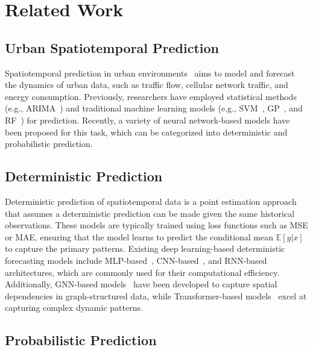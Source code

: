 \section{Related Work}
\subsection{Urban Spatiotemporal Prediction}

Spatiotemporal prediction in urban environments~\cite{zhang2017deep, yuan2024unist, yu2017spatio} aims to model and forecast the dynamics of urban data, such as traffic flow, cellular network traffic, and energy consumption. Previously, researchers have employed statistical methods (e.g., ARIMA~\cite{bouznad2020trend}) and traditional machine learning models (e.g., SVM~\cite{ohashi2012wind}, GP~\cite{senanayake2016predicting}, and RF~\cite{hengl2018random}) for prediction. Recently, a variety of neural network-based models have been proposed for this task, which can be categorized into deterministic and probabilistic prediction. 

\subsection{Deterministic  Prediction}

Deterministic prediction of spatiotemporal data is a point estimation approach that assumes a deterministic prediction can be made given the same historical observations. These models are typically trained using loss functions such as MSE or MAE, ensuring that the model learns to predict the conditional mean \(\mathbb{E}[y|x]\) to capture the primary patterns. Existing deep learning-based deterministic forecasting models include MLP-based~\cite{shao2022spatial,qin2023spatio,zhang2023mlpst}, CNN-based~\cite{li2017diffusion,liu2018attentive,zhang2017deep}, and RNN-based~\cite{bai2019passenger,lin2020self,wang2017predrnn,wang2018predrnn++} architectures, which are commonly used for their computational efficiency. Additionally, GNN-based models~\cite{bai2019stg2seq,bai2019stg2seq,bai2020adaptive,geng2019spatiotemporal,jin2023spatio} have been developed to capture spatial dependencies in graph-structured data, while Transformer-based models~\cite{chen2022bidirectional,chen2021s2tnet,jiang2023pdformer,yu2020spatio} excel at capturing complex dynamic patterns. 

\subsection{Probabilistic  Prediction}


